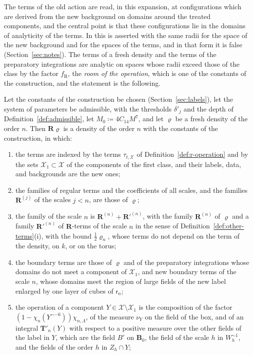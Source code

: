 \documentclass[11pt]{preprint}
\numberwithin{equation}{section}
\begin{document}
The terms of the old action are read, in this expansion, at configurations which are derived from the new background on domains around the treated components, and the central point is that these configurations lie in the domains of analyticity of the terms. In \cite[(1.65), p.~375]{BalabanLFR2} this is asserted with the same radii for the space of the new background and for the spaces of the terms, and in that form it is false (Section~\ref{sec:notes}). The terms of a fresh density and the terms of the preparatory integrations are analytic on spaces whose radii exceed those of the class by the factor $f_{\mathrm R}$, the \emph{room of the operation}, which is one of the constants of the construction, and the statement is the following.

\begin{theorem}\label{thm:r-operation}
Let the constants of the construction be chosen (Section~\ref{sec:labels}), let the system of parameters be admissible, with the thresholds $\delta'_j$ and the depth of Definition~\ref{def:admissible}, let $M_0 \coloneqq 4C_{14}M^7$, and let $\varrho$ be a fresh density of the order $n$. Then $\mathbf R\varrho$ is a density of the order $n$ with the constants of the construction, in which:
\begin{enumerate}[label=(\roman*)]
\item the terms are indexed by the terms $\tau_{t,\mathcal X}$ of Definition~\ref{def:r-operation} and by the sets $\mathcal X_1 \subset \mathcal X$ of the components of the first class, and their labels, data, and backgrounds are the new ones;
\item the families of regular terms and the coefficients of all scales, and the families $\mathbf R^{(j)}$ of the scales $j < n$, are those of $\varrho$;
\item the family of the scale $n$ is $\mathbf R^{(n)} + \mathbf R'^{(n)}$, with the family $\mathbf R^{(n)}$ of $\varrho$ and a family $\mathbf R'^{(n)}$ of $\mathbf R$-terms of the scale $n$ in the sense of Definition~\ref{def:other-terms}(i), with the bound $\frac{1}{2}\varrho_n$, whose terms do not depend on the term of the density, on $k$, or on the torus;
\item the boundary terms are those of $\varrho$ and of the preparatory integrations whose domains do not meet a component of $\mathcal X_1$, and new boundary terms of the scale $n$, whose domains meet the region of large fields of the new label enlarged by one layer of cubes of $\mathsf r_n$;
\item the operation of a component $Y \in \mathcal X \setminus \mathcal X_1$ is the composition of the factor $(1 - \chi_n(Y^{\sim-6}))\chi_{n,\Lambda}$, of the measure $\nu_Y$ on the field of the box, and of an integral $\mathbf T'_n(Y)$ with respect to a positive measure over the other fields of the label in $Y$, which are the field $B'$ on $\mathbf B_0$, the field of the scale $h$ in $W_h^{\sim1}$, and the fields of the order $h$ in $Z_h \cap Y$;

\end{enumerate}
\end{theorem}
\end{document}
